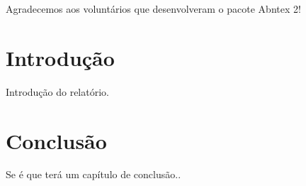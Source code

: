 \documentclass[
	12pt,				%
	oneside,			%
	a4paper,			%
	english,			%
	spanish,			%
	brazil,				%
	]{AeroDesign} 		%
\begin{document}

\frenchspacing 


\imprimircapa

\begin{agradecimentos}

Agradecemos aos voluntários que desenvolveram o pacote Abntex 2!
\end{agradecimentos}

\begin{simbolos}

\end{simbolos}

\tableofcontents*


\textual

\pagestyle{plain}

\chapter*[Introdução]{Introdução}
Introdução do relatório.


\chapter{Conclusão}
Se é que terá um capítulo de conclusão..
\postextual


\end{document}

